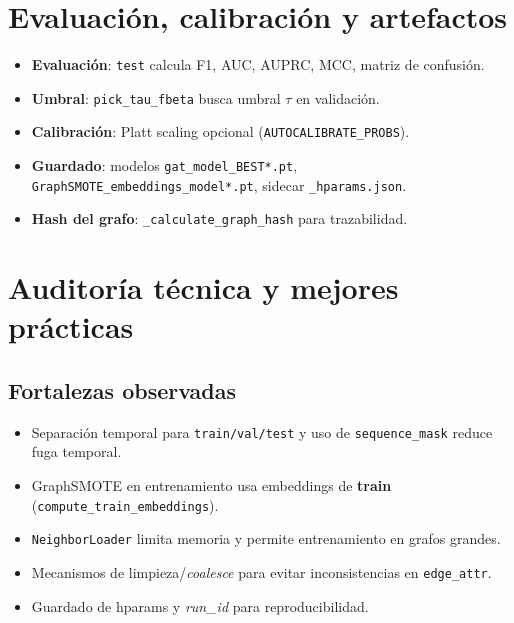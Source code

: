 \section{Evaluaci\'on, calibraci\'on y artefactos}
\begin{itemize}[leftmargin=*]
  \item \textbf{Evaluaci\'on}: \texttt{test} calcula F1, AUC, AUPRC, MCC, matriz de confusi\'on.
  \item \textbf{Umbral}: \texttt{pick\_tau\_fbeta} busca umbral \(\tau\) en validaci\'on.
  \item \textbf{Calibraci\'on}: Platt scaling opcional (\texttt{AUTOCALIBRATE\_PROBS}).
  \item \textbf{Guardado}: modelos \texttt{gat\_model\_BEST*.pt}, \texttt{GraphSMOTE\_embeddings\_model*.pt}, sidecar \texttt{\_hparams.json}.
  \item \textbf{Hash del grafo}: \texttt{\_calculate\_graph\_hash} para trazabilidad.
\end{itemize}

\section{Auditor\'ia t\'ecnica y mejores pr\'acticas}
\subsection{Fortalezas observadas}
\begin{itemize}[leftmargin=*]
  \item Separaci\'on temporal para \texttt{train/val/test} y uso de \texttt{sequence\_mask} reduce fuga temporal.
  \item GraphSMOTE en entrenamiento usa embeddings de \textbf{train} (\texttt{compute\_train\_embeddings}).
  \item \texttt{NeighborLoader} limita memoria y permite entrenamiento en grafos grandes.
  \item Mecanismos de limpieza/\emph{coalesce} para evitar inconsistencias en \texttt{edge\_attr}.
  \item Guardado de hparams y \emph{run\_id} para reproducibilidad.
\end{itemize}

